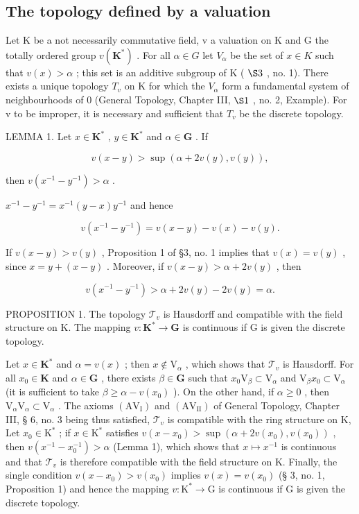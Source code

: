 \subsection{The topology defined by a valuation}

Let K be a not necessarily commutative field, v a valuation on K and G the totally ordered group \(v(\mathbf{K}^{*})\) . For all \(\alpha \in G\) let \(V_{\alpha}\) be the set of \(x \in K\) such that \(v(x) > \alpha\) ; this set is an additive subgroup of K ( \(\S 3\) , no. 1). There exists a unique topology \(T_{v}\) on K for which the \(V_{\alpha}\) form a fundamental system of neighbourhoods of 0 (General Topology, Chapter III, \(\S 1\) , no. 2, Example). For v to be improper, it is necessary and sufficient that \(T_{v}\) be the discrete topology.

LEMMA 1. Let \(x \in \mathbf{K}^*\) , \(y \in \mathbf{K}^*\) and \(\alpha \in \mathbf{G}\) . If

\[
v (x - y) > \sup (\alpha + 2 v (y), v (y)),
\]

then \(v(x^{-1} - y^{-1}) > \alpha\) .

\(x^{-1} - y^{-1} = x^{-1}(y - x)y^{-1}\) and hence

\[
v (x ^ {- 1} - y ^ {- 1}) = v (x - y) - v (x) - v (y).
\]

If \(v(x - y) > v(y)\) , Proposition 1 of §3, no. 1 implies that \(v(x) = v(y)\) , since \(x = y + (x - y)\) . Moreover, if \(v(x - y) > \alpha + 2v(y)\) , then

\[
v (x ^ {- 1} - y ^ {- 1}) > \alpha + 2 v (y) - 2 v (y) = \alpha .
\]

PROPOSITION 1. The topology \(\mathcal{T}_{v}\) is Hausdorff and compatible with the field structure on K. The mapping \(v: \mathbf{K}^{*} \to \mathbf{G}\) is continuous if G is given the discrete topology.

Let \(x \in \mathbf{K}^*\) and \(\alpha = v(x)\) ; then \(x \notin \mathrm{V}_{\alpha}\) , which shows that \(\mathcal{T}_v\) is Hausdorff. For all \(x_0 \in \mathbf{K}\) and \(\alpha \in \mathbf{G}\) , there exists \(\beta \in \mathbf{G}\) such that \(x_0\mathrm{V}_{\beta} \subset \mathrm{V}_{\alpha}\) and \(\mathrm{V}_{\beta}x_0 \subset \mathrm{V}_{\alpha}\) (it is sufficient to take \(\beta \geqslant \alpha - v(x_0)\) ). On the other hand, if \(\alpha \geqslant 0\) , then \(\mathrm{V}_{\alpha}\mathrm{V}_{\alpha} \subset \mathrm{V}_{\alpha}\) . The axioms \((\mathrm{AV}_{\mathrm{I}})\) and \((\mathrm{AV}_{\mathrm{II}})\) of General Topology, Chapter III, § 6, no. 3 being thus satisfied, \(\mathcal{T}_{v}\) is compatible with the ring structure on K, Let \(x_{0} \in \mathrm{K}^{*}\) ; if \(x \in \mathrm{K}^{*}\) satisfies \(v(x - x_{0}) > \sup (\alpha + 2v(x_{0}), v(x_{0}))\) , then \(v(x^{-1} - x_{0}^{-1}) > \alpha\) (Lemma 1), which shows that \(x \mapsto x^{-1}\) is continuous and that \(\mathcal{T}_{v}\) is therefore compatible with the field structure on K. Finally, the single condition \(v(x - x_{0}) > v(x_{0})\) implies \(v(x) = v(x_{0})\) (§ 3, no. 1, Proposition 1) and hence the mapping \(v: \mathrm{K}^{*} \to \mathrm{G}\) is continuous if G is given the discrete topology.

